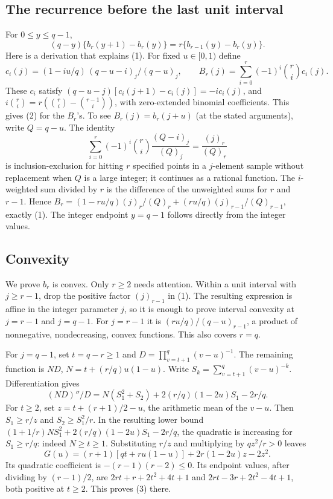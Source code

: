 \documentclass[10pt]{article}
\begin{document}
\subsection*{The recurrence before the last unit
interval}\label{the-recurrence-before-the-last-unit-interval}

For \(0\le y\le q-1\), \[
 (q-y)\{b_r(y+1)-b_r(y)\}=r\{b_{r-1}(y)-b_r(y)\}.           \tag{2}
\] Here is a derivation that explains (1). For fixed \(u\in[0,1)\)
define \[
 c_i(j)=(1-iu/q)\,(q-u-i)_j/(q-u)_j,\qquad
 B_r(j)=\sum_{i=0}^{r}(-1)^i {r\choose i}c_i(j).
\] These \(c_i\) satisfy \((q-u-j)[c_i(j+1)-c_i(j)]=-i c_i(j)\), and
\(i{r\choose i}=r({r\choose i}-{r-1\choose i})\), with zero-extended
binomial coefficients. This gives (2) for the \(B_r\)'s. To see
\(B_r(j)=b_r(j+u)\) (at the stated arguments), write \(Q=q-u\). The
identity \[
 \sum_{i=0}^r(-1)^i{r\choose i}\frac{(Q-i)_j}{(Q)_j}
  =\frac{(j)_r}{(Q)_r}
\] is inclusion-exclusion for hitting \(r\) specified points in a
\(j\)-element sample without replacement when \(Q\) is a large integer;
it continues as a rational function. The \(i\)-weighted sum divided by
\(r\) is the difference of the unweighted sums for \(r\) and \(r-1\).
Hence \(B_r=(1-ru/q)(j)_r/(Q)_r+(ru/q)(j)_{r-1}/(Q)_{r-1}\), exactly
(1). The integer endpoint \(y=q-1\) follows directly from the integer
values.

\subsection*{Convexity}\label{convexity}

We prove \(b_r\) is convex. Only \(r\ge2\) needs attention. Within a
unit interval with \(j\ge r-1\), drop the positive factor \((j)_{r-1}\)
in (1). The resulting expression is affine in the integer parameter
\(j\), so it is enough to prove interval convexity at \(j=r-1\) and
\(j=q-1\). For \(j=r-1\) it is \((ru/q)/(q-u)_{r-1}\), a product of
nonnegative, nondecreasing, convex functions. This also covers \(r=q\).

For \(j=q-1\), set \(t=q-r\ge1\) and \(D=\prod_{v=t+1}^{q}(v-u)^{-1}\).
The remaining function is \(ND\), \(N=t+(r/q)u(1-u)\). Write
\(S_k=\sum_{v=t+1}^q(v-u)^{-k}\). Differentiation gives \[
 (ND)''/D=N(S_1^2+S_2)+2(r/q)(1-2u)S_1-2r/q.              \tag{3}
\] For \(t\ge2\), set \(z=t+(r+1)/2-u\), the arithmetic mean of the
\(v-u\). Then \(S_1\ge r/z\) and \(S_2\ge S_1^2/r\). In the resulting
lower bound \((1+1/r)NS_1^2+2(r/q)(1-2u)S_1-2r/q\), the quadratic is
increasing for \(S_1\ge r/q\): indeed \(N\ge t\ge1\). Substituting
\(r/z\) and multiplying by \(qz^2/r>0\) leaves \[
 G(u)=(r+1)[qt+ru(1-u)]+2r(1-2u)z-2z^2.
\] Its quadratic coefficient is \(-(r-1)(r-2)\le0\). Its endpoint
values, after dividing by \((r-1)/2\), are \(2rt+r+2t^2+4t+1\) and
\(2rt-3r+2t^2-4t+1\), both positive at \(t\ge2\). This proves (3) there.
\end{document}
